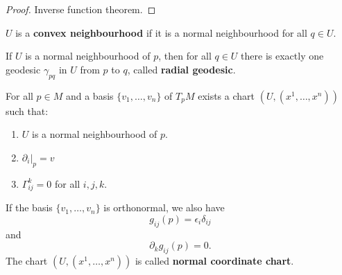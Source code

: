 \begin{proof}
    Inverse function theorem.
\end{proof}
\begin{definition}
    $U$ is a \textbf{convex neighbourhood} if it is a normal neighbourhood for all $q \in U$.
\end{definition}
\begin{remark}
    If $U$ is a normal neighbourhood of $p$, then for all $q \in U$ there is exactly one geodesic $\gamma_{pq}$ in $U$ from $p$ to $q$, called \textbf{radial geodesic}.
\end{remark}
\begin{theorem}
    For all $p \in M$ and a basis $\{v_1, \dots, v_n\}$ of $T_pM$ exists a chart $(U, (x^1, \dots, x^n))$ such that:
    \begin{enumerate}
        \item $U$ is a normal neighbourhood of $p$.
        \item $\partial_i|_p = v$
        \item $\Gamma_{ij}^k =0$ for all $i,j,k$.
    \end{enumerate}
If the basis $\{v_1, \dots, v_n \}$ is orthonormal, we also have \[
    g_{ij}(p)=\epsilon_i \delta_{ij}
\] and \[
\partial_k g_{ij}(p)=0
.\]  The chart $(U,(x^1, \dots, x^n))$ is called \textbf{normal coordinate chart}.
\end{theorem}
